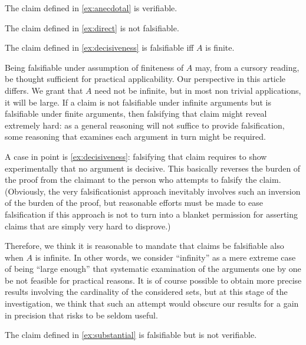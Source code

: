 \documentclass[version=3.21, pagesize, twoside=off, bibliography=totoc, DIV=calc, fontsize=12pt, a4paper]{scrartcl}
\begin{document}
\begin{example}
	The claim defined in \cref{ex:anecdotal} is verifiable.
\end{example}
\begin{example}
	The claim defined in \cref{ex:direct} is not falsifiable.
\end{example}
\begin{example}
	The claim defined in \cref{ex:decisiveness} is falsifiable iff $A$ is finite.
\end{example}
\begin{remark}
	Being falsifiable under assumption of finiteness of $A$ may, from a cursory reading, be thought sufficient for practical applicability. Our perspective in this article differs. We grant that $A$ need not be infinite, but in most non trivial applications, it will be large. If a claim is not falsifiable under infinite arguments but is falsifiable under finite arguments, then falsifying that claim might reveal extremely hard: as a general reasoning will not suffice to provide falsification, some reasoning that examines each argument in turn might be required.
	
	A case in point is \cref{ex:decisiveness}: falsifying that claim requires to show experimentally that no argument is decisive. This basically reverses the burden of the proof from the claimant to the person who attempts to falsify the claim.
	(Obviously, the very falsificationist approach inevitably involves such an inversion of the burden of the proof, but reasonable efforts must be made to ease falsification if this approach is not to turn into a blanket permission for asserting claims that are simply very hard to disprove.)
	
	Therefore, we think it is reasonable to mandate that claims be falsifiable also when $A$ is infinite. In other words, we consider “infinity” as a mere extreme case of being “large enough” that systematic examination of the arguments one by one be not feasible for practical reasons. It is of course possible to obtain more precise results involving the cardinality of the considered sets, but at this stage of the investigation, we think that such an attempt would obscure our results for a gain in precision that risks to be seldom useful.
\end{remark}
	
\begin{example}
	The claim defined in \cref{ex:substantial} is falsifiable but is not verifiable.
\end{example}
\end{document}
